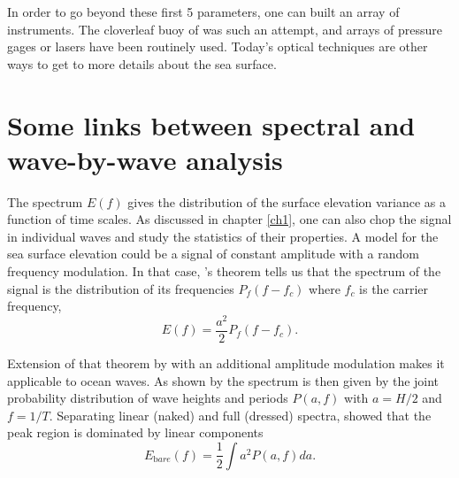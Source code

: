 In order to go beyond these first 5 parameters, one can built an array of instruments. The cloverleaf buoy of \cite{Mitsuyasu&al.1975} was such an attempt, and arrays of pressure gages or lasers have been routinely used. Today's optical techniques \citep{Benetazzo2006,Fedele&al.2013,Laxague&al.2015} are other ways to get to more details about the sea surface.


\section{Some links between spectral and wave-by-wave analysis}
The spectrum $E(f)$ gives the distribution of the surface elevation variance as a function of time scales. As discussed in chapter \ref{ch1}, one can also chop the 
signal in individual waves and study the statistics of their properties. 
A model for the sea surface elevation could be a signal of constant amplitude with a random frequency modulation. In that case, \cite{Woodward1952}'s theorem 
tells us that the spectrum of the signal is the distribution of its frequencies $P_f(f-f_c)$ where $f_c$ is the carrier frequency,
\begin{equation}
    E(f) = \frac{a^2}{2}P_f(f-f_c).
\end{equation}

Extension of that theorem by \cite{Blachman&McAlpine1969} with an additional amplitude modulation makes it applicable to ocean waves.  As  shown by  \cite{Elfouhaily&al.2003} the spectrum is then given by the joint probability distribution of wave heights and periods $P(a,f)$ with $a=H/2$ and $f=1/T$. 
Separating linear (naked) and full (dressed) spectra, \cite{Elfouhaily&al.2003} showed that the peak region is dominated by linear components 
\begin{equation}
    E_{\mathrm bare}(f) = \frac{1}{2}\int a^2 P(a,f) da.
\end{equation}


